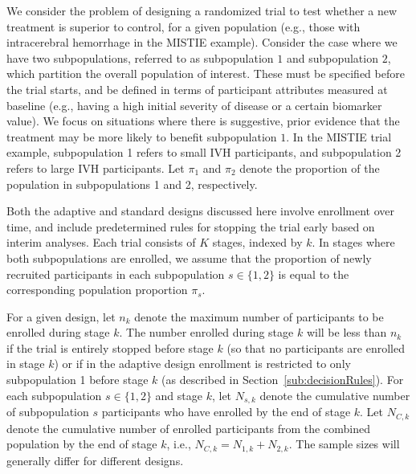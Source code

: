 \documentclass[article]{jss}
\begin{document}
We consider the problem of designing a randomized trial to test whether a new treatment is superior to control, for a given population (e.g., those with intracerebral hemorrhage in  the MISTIE example).
Consider the case where we have two subpopulations, referred to as subpopulation $1$ and subpopulation $2$, which partition the overall population of interest. These must be specified before the trial starts, and be defined in terms of participant attributes measured at baseline (e.g., having a high initial severity of disease or a certain biomarker value). 
We focus on situations where  there is suggestive, prior evidence that the treatment may be more likely to benefit subpopulation $1$.
In the MISTIE trial example, subpopulation 1 refers to small IVH participants, and subpopulation 2 refers to large IVH participants. 
Let $π_1$ and $π_2$ denote the proportion of the population in subpopulations 1 and 2, respectively. %

Both the adaptive and standard designs discussed here involve enrollment over time, and include predetermined rules for stopping the trial early based on interim analyses. Each trial consists of $K$ stages, indexed by $k$. 
In stages where both subpopulations are enrolled, we assume that the proportion of newly recruited participants  in each subpopulation $s \in \{1,2\}$ is equal to the corresponding population proportion $\pi_s$. %

For a given design, let $n_k$ denote the maximum number of participants to be enrolled during stage $k$. The number enrolled during stage $k$ will be less than $n_k$ if the trial is entirely stopped before stage $k$ (so that no participants are enrolled in stage $k$) or if in the adaptive design enrollment is restricted to only subpopulation 1 before stage $k$ (as described in Section~\ref{sub:decisionRules}). For each subpopulation $s \in \{1,2\}$ and stage $k$, let $N_{s,k}$ denote the cumulative number of subpopulation $s$ participants who have enrolled by the end of stage $k$. Let $N_{C,k}$ denote the cumulative number of enrolled participants from the combined population by the end of stage $k$, i.e.,  $N_{C,k}=N_{1,k}+N_{2,k}$.
The sample sizes will generally differ for different designs.
\end{document}
